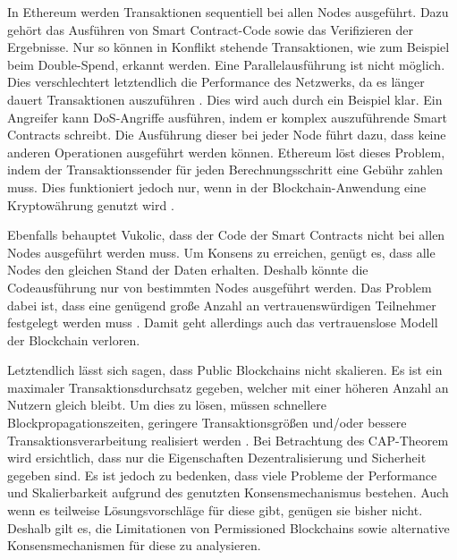 In Ethereum werden Transaktionen sequentiell bei allen Nodes ausgeführt. Dazu gehört das Ausführen von Smart Contract-Code sowie das Verifizieren der Ergebnisse. Nur so können in Konflikt stehende Transaktionen, wie zum Beispiel beim Double-Spend, erkannt werden. Eine Parallelausführung ist nicht möglich. Dies verschlechtert letztendlich die Performance des Netzwerks, da es länger dauert Transaktionen auszuführen \cite{SchererPerformanceScalabilityBlockchain2017}. Dies wird auch durch ein Beispiel klar. Ein Angreifer kann DoS-Angriffe ausführen, indem er komplex auszuführende Smart Contracts schreibt. Die Ausführung dieser bei jeder Node führt dazu, dass keine anderen Operationen ausgeführt werden können. Ethereum löst dieses Problem, indem der Transaktionssender für jeden Berechnungsschritt eine Gebühr zahlen muss. Dies funktioniert jedoch nur, wenn in der Blockchain-Anwendung eine Kryptowährung genutzt wird \cite{VukolicRethinkingPermissionedBlockchains2017}. 

Ebenfalls behauptet Vukolic, dass der Code der Smart Contracts nicht bei allen Nodes ausgeführt werden muss. Um Konsens zu erreichen, genügt es, dass alle Nodes den gleichen Stand der Daten erhalten. Deshalb könnte die Codeausführung nur von bestimmten Nodes ausgeführt werden. Das Problem dabei ist, dass eine genügend große Anzahl an vertrauenswürdigen Teilnehmer festgelegt werden muss \cite{VukolicRethinkingPermissionedBlockchains2017}. Damit geht allerdings auch das vertrauenslose Modell der Blockchain verloren.

Letztendlich lässt sich sagen, dass Public Blockchains nicht skalieren. Es ist ein maximaler Transaktionsdurchsatz gegeben, welcher mit einer höheren Anzahl an Nutzern gleich bleibt. Um dies zu lösen, müssen schnellere Blockpropagationszeiten, geringere Transaktionsgrößen und/oder bessere Transaktionsverarbeitung realisiert werden \cite{SchererPerformanceScalabilityBlockchain2017}. Bei Betrachtung des CAP-Theorem wird ersichtlich, dass nur die Eigenschaften Dezentralisierung und Sicherheit gegeben sind. Es ist jedoch zu bedenken, dass viele Probleme der Performance und Skalierbarkeit aufgrund des genutzten Konsensmechanismus bestehen. Auch wenn es teilweise Lösungsvorschläge für diese gibt, genügen sie bisher nicht. Deshalb gilt es, die Limitationen von Permissioned Blockchains sowie alternative Konsensmechanismen für diese zu analysieren.


